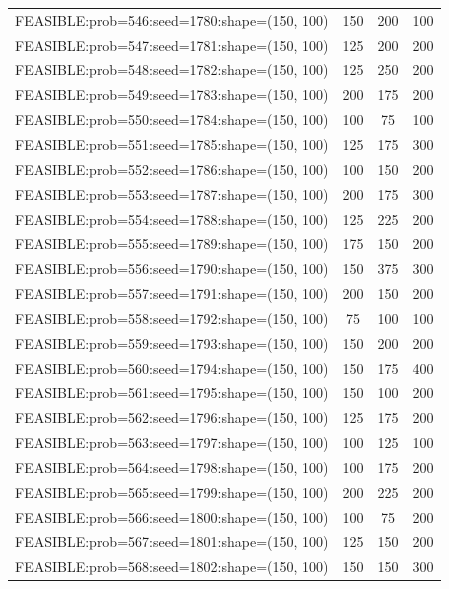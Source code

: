 \begin{longtable}{lccc}
FEASIBLE:prob=546:seed=1780:shape=(150, 100) &      150 &   200 &    100 \\
FEASIBLE:prob=547:seed=1781:shape=(150, 100) &      125 &   200 &    200 \\
FEASIBLE:prob=548:seed=1782:shape=(150, 100) &      125 &   250 &    200 \\
FEASIBLE:prob=549:seed=1783:shape=(150, 100) &      200 &   175 &    200 \\
FEASIBLE:prob=550:seed=1784:shape=(150, 100) &      100 &    75 &    100 \\
FEASIBLE:prob=551:seed=1785:shape=(150, 100) &      125 &   175 &    300 \\
FEASIBLE:prob=552:seed=1786:shape=(150, 100) &      100 &   150 &    200 \\
FEASIBLE:prob=553:seed=1787:shape=(150, 100) &      200 &   175 &    300 \\
FEASIBLE:prob=554:seed=1788:shape=(150, 100) &      125 &   225 &    200 \\
FEASIBLE:prob=555:seed=1789:shape=(150, 100) &      175 &   150 &    200 \\
FEASIBLE:prob=556:seed=1790:shape=(150, 100) &      150 &   375 &    300 \\
FEASIBLE:prob=557:seed=1791:shape=(150, 100) &      200 &   150 &    200 \\
FEASIBLE:prob=558:seed=1792:shape=(150, 100) &       75 &   100 &    100 \\
FEASIBLE:prob=559:seed=1793:shape=(150, 100) &      150 &   200 &    200 \\
FEASIBLE:prob=560:seed=1794:shape=(150, 100) &      150 &   175 &    400 \\
FEASIBLE:prob=561:seed=1795:shape=(150, 100) &      150 &   100 &    200 \\
FEASIBLE:prob=562:seed=1796:shape=(150, 100) &      125 &   175 &    200 \\
FEASIBLE:prob=563:seed=1797:shape=(150, 100) &      100 &   125 &    100 \\
FEASIBLE:prob=564:seed=1798:shape=(150, 100) &      100 &   175 &    200 \\
FEASIBLE:prob=565:seed=1799:shape=(150, 100) &      200 &   225 &    200 \\
FEASIBLE:prob=566:seed=1800:shape=(150, 100) &      100 &    75 &    200 \\
FEASIBLE:prob=567:seed=1801:shape=(150, 100) &      125 &   150 &    200 \\
FEASIBLE:prob=568:seed=1802:shape=(150, 100) &      150 &   150 &    300 \\

\end{longtable}
